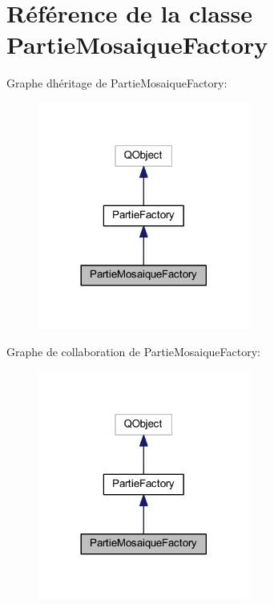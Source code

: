 \hypertarget{class_partie_mosaique_factory}{}\section{Référence de la classe Partie\+Mosaique\+Factory}
\label{class_partie_mosaique_factory}


Graphe d\textquotesingle{}héritage de Partie\+Mosaique\+Factory\+:
\nopagebreak
\begin{figure}[H]
\begin{center}
\leavevmode
\includegraphics[width=197pt]{class_partie_mosaique_factory__inherit__graph}
\end{center}
\end{figure}


Graphe de collaboration de Partie\+Mosaique\+Factory\+:
\nopagebreak
\begin{figure}[H]
\begin{center}
\leavevmode
\includegraphics[width=197pt]{class_partie_mosaique_factory__coll__graph}
\end{center}
\end{figure}
